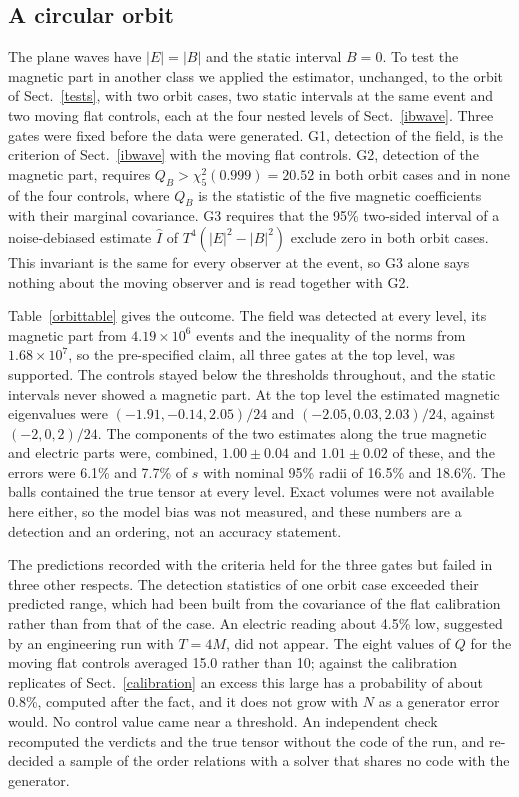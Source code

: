 \documentclass[11pt,a4paper]{article}
\begin{document}
\subsection{A circular orbit}\label{orbit}
The plane waves have $|E|=|B|$ and the static interval $B=0$. To test the
magnetic part in another class we applied the estimator, unchanged, to the
orbit of Sect.~\ref{tests}, with two orbit cases, two static intervals at the
same event and two moving flat controls, each at the four nested levels of
Sect.~\ref{ibwave}. Three gates were fixed before the data were generated.
G1, detection of the field, is the criterion of Sect.~\ref{ibwave} with the
moving flat controls. G2, detection of the magnetic part, requires
$Q_B>\chi^2_5(0.999)=20.52$ in both orbit cases and in none of the four
controls, where $Q_B$ is the statistic of the five magnetic coefficients with
their marginal covariance. G3 requires that the 95\% two-sided interval of a
noise-debiased estimate $\hat I$ of $T^4(|E|^2-|B|^2)$ exclude zero in both
orbit cases. This invariant is the same for every observer at the event, so
G3 alone says nothing about the moving observer and is read together with
G2.

Table~\ref{orbittable} gives the outcome. The field was detected at every
level, its magnetic part from $4.19\times10^6$ events and the inequality of
the norms from $1.68\times10^7$, so the pre-specified claim, all three gates
at the top level, was supported. The controls stayed below the thresholds
throughout, and the static intervals never showed a magnetic part. At the
top level the estimated magnetic eigenvalues were $(-1.91,-0.14,2.05)/24$
and $(-2.05,0.03,2.03)/24$, against $(-2,0,2)/24$. The components of the two
estimates along the true magnetic and electric parts were, combined,
$1.00\pm0.04$ and $1.01\pm0.02$ of these, and the errors were 6.1\% and
7.7\% of $s$ with nominal 95\% radii of 16.5\% and 18.6\%. The balls
contained the true tensor at every level. Exact volumes were not available
here either, so the model bias was not measured, and these numbers are a
detection and an ordering, not an accuracy statement.

The predictions recorded with the criteria held for the three gates but
failed in three other respects. The detection statistics of one orbit case
exceeded their predicted range, which had been built from the covariance of
the flat calibration rather than from that of the case. An electric reading
about 4.5\% low, suggested by an engineering run with $T=4M$, did not appear.
The eight values of $Q$ for the moving flat controls averaged 15.0 rather
than 10; against the calibration replicates of Sect.~\ref{calibration} an
excess this large has a probability of about 0.8\%, computed after the fact,
and it does not grow with $N$ as a generator error would. No control value
came near a threshold. An independent check recomputed the verdicts and the
true tensor without the code of the run, and re-decided a sample of the
order relations with a solver that shares no code with the generator.
\end{document}
